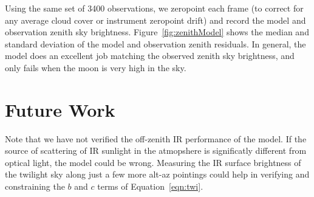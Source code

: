 \documentclass{emulateapj}  %
\begin{document}
Using the same set of 3400 observations, we zeropoint each frame (to correct for any average cloud cover or instrument zeropoint drift) and record the model and observation zenith sky brightness. Figure~\ref{fig:zenithModel} shows the median and standard deviation of the model and observation zenith residuals.  In general, the model does an excellent job matching the observed zenith sky brightness, and only fails when the moon is very high in the sky.  




\begin{figure*}
  \caption{Comparing the angular distance between the model-predicted darkest spot on the sky and the darkest spot as observed by the Canon all-sky camera \label{fig:darkDir}.  Most of the variation can be attributed to frames with clouds. Dashed lines mark moon-rise and the end of twilight.}
\end{figure*}

\clearpage


\begin{figure*}
  \caption{ The difference between the model predicted zenith sky brightness and the observed values from the Canon all-sky camera.  The model does tend to fail very near the moon, thus the large residuals when the moon reaches high is expected.  \label{fig:zenithModel}}
\end{figure*}


\section{Future Work}

Note that we have not verified the off-zenith IR performance of the model. If the source of scattering of IR sunlight in the atmopshere is significatly different from optical light, the model could be wrong. Measuring the IR surface brightness of the twilight sky along just a few more alt-az pointings could help in verifying and constraining the $b$ and $c$ terms of Equation~\ref{eqn:twi}.
\end{document}
